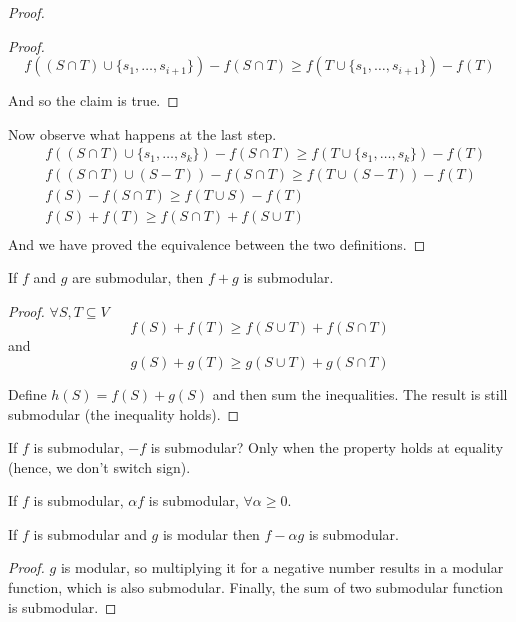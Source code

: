 \begin{proof}
\begin{proof}
\begin{equation}
f((S \cap T) \cup \{s_1, \ldots, s_{i+1}\}) - f(S\cap T) \geq  f(T \cup \{s_1, \ldots, s_{i+1}\}) -f(T)
\end{equation}

And so the claim is true.
\end{proof}

Now observe what happens at the last step.
\begin{align*}
&f((S \cap T) \cup \{s_1, \ldots, s_k\}) - f(S\cap T) \geq f(T \cup \{s_1,\ldots, s_k\}) -f(T)\\
&f((S \cap T) \cup (S - T)) - f(S\cap T) \geq  f(T \cup (S - T)) -f(T)\\
&f(S) - f(S\cap T) \geq  f(T \cup S) -f(T)\\
&f(S) + f(T) \geq f(S \cap T) + f(S \cup T)\\
\end{align*}
And we have proved the equivalence between the two definitions.
\end{proof}
\begin{claim}\label{cl:sumsub}
	If $f$ and $g$ are submodular, then $f+g$ is submodular.
\end{claim}
\begin{proof}
$\forall S, T \subseteq V$
\begin{equation*}
f(S) + f(T) \geq f(S \cup T) + f(S \cap T)
\end{equation*}
and
\begin{equation*}
g(S) + g(T) \geq g(S \cup T) + g(S \cap T)
\end{equation*}

Define $h(S) = f(S) + g(S)$ and then sum the inequalities. The result is still submodular (the inequality holds).
\end{proof}

If $f$ is submodular, $-f$ is submodular? Only when the property holds at equality (hence, we don't switch sign).

\begin{claim}
	If $f$ is submodular, $\alpha f$ is submodular, $\forall \alpha \geq 0$.
\end{claim}

\begin{claim}
	If $f$ is submodular and $g$ is modular then $f - \alpha g$ is submodular.
\end{claim}
\begin{proof}
	$g$ is modular, so multiplying it for a negative number results in a modular function, which is also submodular. Finally, the sum of two submodular function is submodular.
\end{proof}

